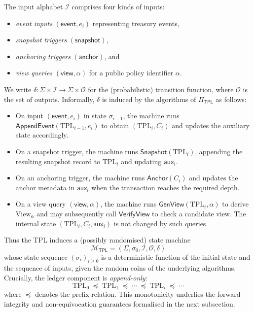 \documentclass[11pt]{article}
\begin{document}
The input alphabet $\mathcal{I}$ comprises four kinds of inputs:
\begin{itemize}[noitemsep]
  \item \emph{event inputs} $(\mathsf{event}, e_i)$ representing treasury events,
  \item \emph{snapshot triggers} $(\mathsf{snapshot})$,
  \item \emph{anchoring triggers} $(\mathsf{anchor})$, and
  \item \emph{view queries} $(\mathsf{view}, \alpha)$ for a public policy identifier $\alpha$.
\end{itemize}
We write $\delta : \Sigma \times \mathcal{I} \rightarrow \Sigma \times \mathcal{O}$
for the (probabilistic) transition function, where $\mathcal{O}$ is the set of outputs.
Informally, $\delta$ is induced by the algorithms of $\Pi_{\mathsf{TPL}}$ as follows:
\begin{itemize}[noitemsep]
  \item On input $(\mathsf{event}, e_i)$ in state $\sigma_{i-1}$, the machine runs
        $\mathsf{AppendEvent}(\mathrm{TPL}_{i-1}, e_i)$ to obtain $(\mathrm{TPL}_i, C_i)$
        and updates the auxiliary state accordingly.
  \item On a snapshot trigger, the machine runs $\mathsf{Snapshot}(\mathrm{TPL}_i)$,
        appending the resulting snapshot record to $\mathrm{TPL}_i$ and updating $\mathsf{aux}_i$.
  \item On an anchoring trigger, the machine runs $\mathsf{Anchor}(C_i)$
        and updates the anchor metadata in $\mathsf{aux}_i$ when the transaction reaches the required depth.
  \item On a view query $(\mathsf{view}, \alpha)$, the machine runs
        $\mathsf{GenView}(\mathrm{TPL}_i,\alpha)$ to derive $\mathrm{View}_\alpha$
        and may subsequently call $\mathsf{VerifyView}$ to check a candidate view.
        The internal state $(\mathrm{TPL}_i, C_i, \mathsf{aux}_i)$ is not changed by such queries.
\end{itemize}

Thus the TPL induces a (possibly randomised) state machine
\[
  \mathcal{M}_{\mathsf{TPL}} = (\Sigma, \sigma_0, \mathcal{I}, \mathcal{O}, \delta)
\]
whose state sequence $(\sigma_i)_{i\geq 0}$ is a deterministic function of the
initial state and the sequence of inputs, given the random coins of the underlying
algorithms.
Crucially, the ledger component is \emph{append-only}:
\[
  \mathrm{TPL}_0 \;\preceq\; \mathrm{TPL}_1 \;\preceq\; \cdots \;\preceq\; \mathrm{TPL}_i \;\preceq\; \cdots
\]
where $\preceq$ denotes the prefix relation.
This monotonicity underlies the forward-integrity and non-equivocation guarantees
formalised in the next subsection.
\end{document}
